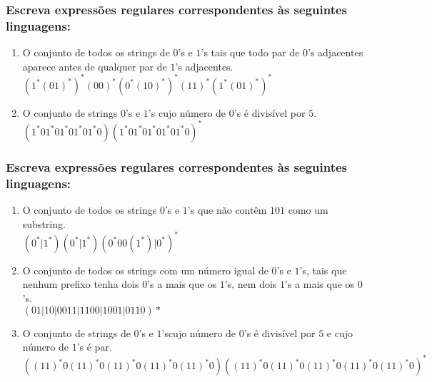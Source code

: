        \subsubsection{Escreva expressões regulares corresponden\-tes às seguintes linguagens:}
            \begin{enumerate}[label={\bfseries \alph*)}]
                \item O conjunto de todos os strings de $0$'s e $1$'s tais que todo par de $0$'s adjacentes aparece antes de qualquer par de $1$'s adjacentes.
                    \\ $(1^*(01)^*)^*(00)^*(0^*(10)^*)^*(11)^*(1^*(01)^*)^*$
                \item O conjunto de strings $0$'s e $1$'s cujo número de $0$'s é divisível por $5$.
                    \\ $(1^*01^*01^*01^*01^*0)(1^*01^*01^*01^*01^*0)^*$
            \end{enumerate}
        
        \subsubsection{Escreva expressões regulares corresponden\-tes às seguintes linguagens:}
            \begin{enumerate}[start=1, label={\bfseries \alph*)}]
                \item O conjunto de todos os strings $0$'s e $1$'s que não contêm $101$ como um substring.
                    \\ $(0^*|1^*)(0^*|1^*)(0^*00(1^*)|0^*)^*$
                \item O conjunto de todos os strings com um número igual de $0$'s e $1$'s, tais que nenhum prefixo tenha dois $0$'s a mais que os $1$'s, nem dois $1$'s a mais que os $0$'s.
                    \\ $(01|10|0011|1100|1001|0110)*$
                \item O conjunto de strings de $0$'s e $1$'scujo número de $0$'s é divisível por $5$ e cujo número de $1$'s é par.
                    \\ $((11)^*0(11)^*0(11)^*0(11)^*0(11)^*0)((11)^*0(11)^*0(11)^*0(11)^*0(11)^*0)^*$
            \end{enumerate}
        
